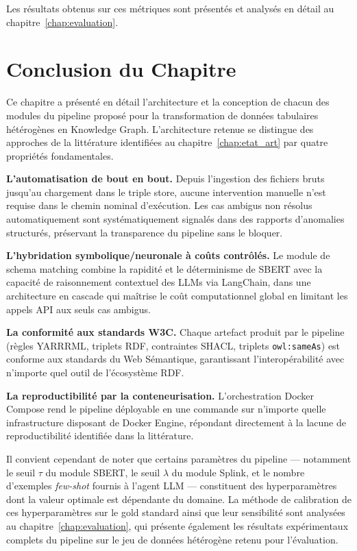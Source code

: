 Les résultats obtenus sur ces métriques sont présentés et analysés
en détail au chapitre~\ref{chap:evaluation}.

\section{Conclusion du Chapitre}
\label{sec:conclusion_methodo}

Ce chapitre a présenté en détail l'architecture et la conception
de chacun des modules du pipeline proposé pour la transformation
de données tabulaires hétérogènes en Knowledge Graph.
L'architecture retenue se distingue des approches de la littérature
identifiées au chapitre~\ref{chap:etat_art} par quatre propriétés
fondamentales.

\textbf{L'automatisation de bout en bout.}
Depuis l'ingestion des fichiers bruts jusqu'au chargement dans le
triple store, aucune intervention manuelle n'est requise dans le
chemin nominal d'exécution.
Les cas ambigus non résolus automatiquement sont systématiquement
signalés dans des rapports d'anomalies structurés, préservant la
transparence du pipeline sans le bloquer.

\textbf{L'hybridation symbolique/neuronale à coûts contrôlés.}
Le module de schema matching combine la rapidité et le déterminisme
de SBERT avec la capacité de raisonnement contextuel des LLMs via
LangChain, dans une architecture en cascade qui maîtrise le coût
computationnel global en limitant les appels API aux seuls cas
ambigus.

\textbf{La conformité aux standards W3C.}
Chaque artefact produit par le pipeline (règles YARRRML, triplets
RDF, contraintes SHACL, triplets \texttt{owl:sameAs}) est conforme
aux standards du Web Sémantique, garantissant l'interopérabilité
avec n'importe quel outil de l'écosystème RDF.

\textbf{La reproductibilité par la conteneurisation.}
L'orchestration Docker Compose rend le pipeline déployable en une
commande sur n'importe quelle infrastructure disposant de Docker
Engine, répondant directement à la lacune de reproductibilité
identifiée dans la littérature.

Il convient cependant de noter que certains paramètres du pipeline
— notamment le seuil $\tau$ du module SBERT, le seuil $\lambda$ du
module Splink, et le nombre d'exemples \textit{few-shot} fournis
à l'agent LLM — constituent des hyperparamètres dont la valeur
optimale est dépendante du domaine.
La méthode de calibration de ces hyperparamètres sur le gold standard
ainsi que leur sensibilité sont analysées au
chapitre~\ref{chap:evaluation}, qui présente également les résultats
expérimentaux complets du pipeline sur le jeu de données hétérogène
retenu pour l'évaluation.